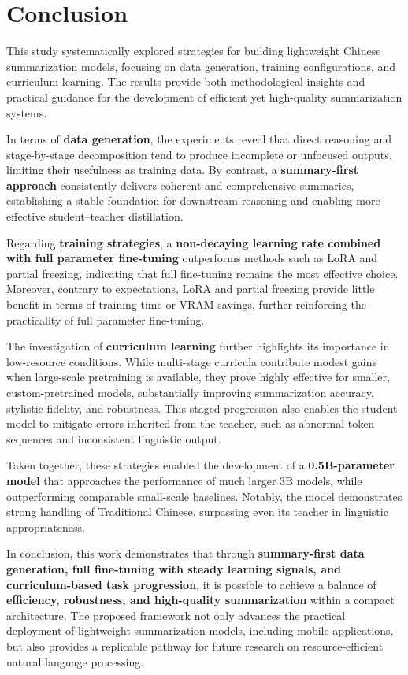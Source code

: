 
\chapter{Conclusion}

This study systematically explored strategies for building lightweight Chinese summarization models, focusing on data generation, training configurations, and curriculum learning. The results provide both methodological insights and practical guidance for the development of efficient yet high-quality summarization systems.

In terms of \textbf{data generation}, the experiments reveal that direct reasoning and stage-by-stage decomposition tend to produce incomplete or unfocused outputs, limiting their usefulness as training data. By contrast, a \textbf{summary-first approach} consistently delivers coherent and comprehensive summaries, establishing a stable foundation for downstream reasoning and enabling more effective student–teacher distillation.

Regarding \textbf{training strategies}, a \textbf{non-decaying learning rate combined with full parameter fine-tuning} outperforms methods such as LoRA and partial freezing, indicating that full fine-tuning remains the most effective choice. Moreover, contrary to expectations, LoRA and partial freezing provide little benefit in terms of training time or VRAM savings, further reinforcing the practicality of full parameter fine-tuning.

The investigation of \textbf{curriculum learning} further highlights its importance in low-resource conditions. While multi-stage curricula contribute modest gains when large-scale pretraining is available, they prove highly effective for smaller, custom-pretrained models, substantially improving summarization accuracy, stylistic fidelity, and robustness. This staged progression also enables the student model to mitigate errors inherited from the teacher, such as abnormal token sequences and inconsistent linguistic output.

Taken together, these strategies enabled the development of a \textbf{0.5B-parameter model} that approaches the performance of much larger 3B models, while outperforming comparable small-scale baselines. Notably, the model demonstrates strong handling of Traditional Chinese, surpassing even its teacher in linguistic appropriateness.

In conclusion, this work demonstrates that through \textbf{summary-first data generation, full fine-tuning with steady learning signals, and curriculum-based task progression}, it is possible to achieve a balance of \textbf{efficiency, robustness, and high-quality summarization} within a compact architecture. The proposed framework not only advances the practical deployment of lightweight summarization models, including mobile applications, but also provides a replicable pathway for future research on resource-efficient natural language processing.
